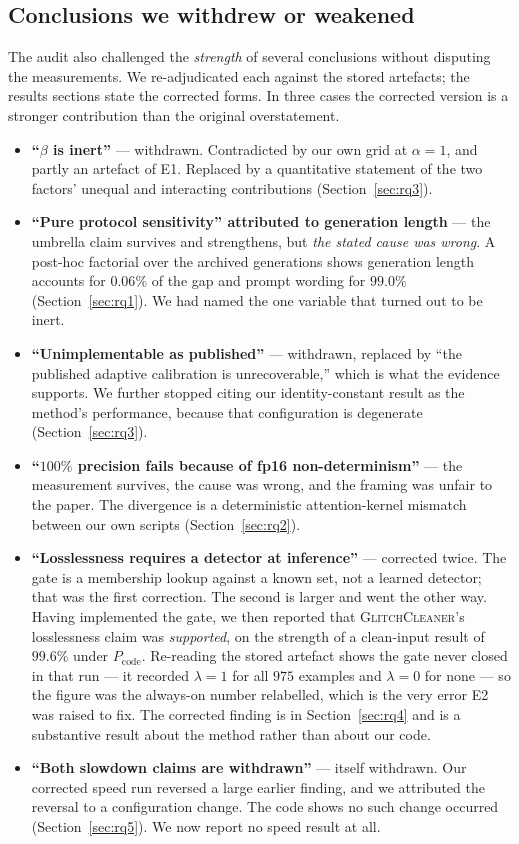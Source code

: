 \documentclass[11pt,a4paper]{article}
\newcommand{\gc}{\textsc{GlitchCleaner}}
\newcommand{\Pcode}{$P_{\mathrm{code}}$}
\begin{document}
\subsection{Conclusions we withdrew or weakened}
\label{sec:withdrawn}

The audit also challenged the \emph{strength} of several conclusions without
disputing the measurements. We re-adjudicated each against the stored artefacts;
the results sections state the corrected forms. In three cases the corrected
version is a stronger contribution than the original overstatement.

\begin{itemize}[leftmargin=*]
\item \textbf{``$\beta$ is inert''} --- withdrawn. Contradicted by our own grid at
$\alpha = 1$, and partly an artefact of E1. Replaced by a quantitative statement
of the two factors' unequal and interacting contributions
(Section~\ref{sec:rq3}).
\item \textbf{``Pure protocol sensitivity'' attributed to generation length} ---
the umbrella claim survives and strengthens, but \emph{the stated cause was
wrong}. A post-hoc factorial over the archived generations shows generation length
accounts for $0.06\%$ of the gap and prompt wording for $99.0\%$
(Section~\ref{sec:rq1}). We had named the one variable that turned out to be
inert.
\item \textbf{``Unimplementable as published''} --- withdrawn, replaced by ``the
published adaptive calibration is unrecoverable,'' which is what the evidence
supports. We further stopped citing our identity-constant result as the method's
performance, because that configuration is degenerate (Section~\ref{sec:rq3}).
\item \textbf{``$100\%$ precision fails because of fp16 non-determinism''} ---
the measurement survives, the cause was wrong, and the framing was unfair to the
paper. The divergence is a deterministic attention-kernel mismatch between our own
scripts (Section~\ref{sec:rq2}).
\item \textbf{``Losslessness requires a detector at inference''} --- corrected
twice. The gate is a membership lookup against a known set, not a learned
detector; that was the first correction. The second is larger and went the other
way. Having implemented the gate, we then reported that \gc{}'s losslessness claim
was \emph{supported}, on the strength of a clean-input result of $99.6\%$ under
\Pcode{}. Re-reading the stored artefact shows the gate never closed in that run
--- it recorded $\lambda = 1$ for all $975$ examples and $\lambda = 0$ for none ---
so the figure was the always-on number relabelled, which is the very error E2 was
raised to fix. The corrected finding is in Section~\ref{sec:rq4} and is a
substantive result about the method rather than about our code.
\item \textbf{``Both slowdown claims are withdrawn''} --- itself withdrawn. Our
corrected speed run reversed a large earlier finding, and we attributed the
reversal to a configuration change. The code shows no such change occurred
(Section~\ref{sec:rq5}). We now report no speed result at all.
\end{itemize}
\end{document}
